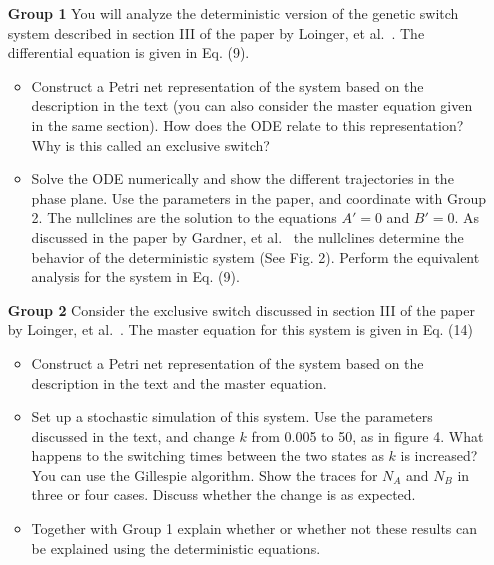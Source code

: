 \documentclass[12pt]{article}
\begin{document}
%
\begin{enumerate}
\item[\bf Group 1] You will analyze the deterministic version of the genetic switch system described in section III of the paper by Loinger, et al.~\cite{loinger07toggle}.  The differential equation is given in Eq. (9). 
\begin{itemize}
\item Construct a Petri net representation of the system based on the description in the text  (you can
also consider the master equation given in the same section).   
How does the ODE relate to this representation? Why is this called an exclusive switch?
\item Solve the ODE numerically and show the different trajectories in the phase plane.
Use the parameters in the paper, and coordinate with Group 2.  
The nullclines are the solution to the equations $A' = 0$ and $B' = 0$.  As discussed in the paper
by Gardner, et al.~\cite{gardner00} the nullclines determine the behavior of the deterministic system (See Fig. 2). Perform the equivalent
analysis for the system in Eq. (9).
\end{itemize}



\item[\bf Group 2] Consider the exclusive switch discussed in section III of the paper by  Loinger, et al.~\cite{loinger07toggle}. The master equation for this system is given in Eq. (14) 
\begin{itemize}
\item Construct a Petri net representation of the system based on the description in the text 
and the master equation. 
\item  Set up a stochastic simulation of this system. Use the parameters discussed in the text, 
and change $k$ from 0.005 to 50, as in figure 4. What happens to the switching times 
between the two states as $k$ is increased? You can use the Gillespie algorithm. 
Show the traces for $N_{A}$ and $N_{B}$ in three or four cases.   Discuss whether the
change is as expected.
\item Together with Group 1 explain whether or whether not these results can be explained 
using the deterministic equations.
\end{itemize}


\end{enumerate}
\end{document}
